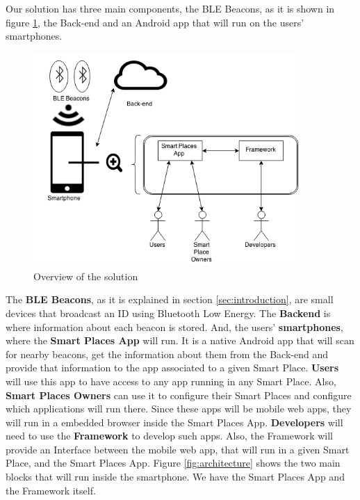 Our solution has three main components,
the BLE Beacons, as it is shown in figure 
\ref{fig:overview_architecture}, 
the Back-end and an Android app
that will run on the users' smartphones.
\begin{figure}[!ht]
  \centering
    \includegraphics[width=0.9\textwidth]{img/overview_architecture}
    \caption{Overview of the solution}
    \label{fig:overview_architecture}
\end{figure}
The \textbf{BLE Beacons}, as it is explained in section 
\ref{sec:introduction}, are small devices that broadcast
an ID using Bluetooth Low Energy. The \textbf{Backend} is where information about each beacon is stored. 
And, the users'
\textbf{smartphones}, where the \textbf{Smart Places App} will run.
It is a native Android app that will scan for nearby beacons,
get the information about them from the Back-end and
provide that information to the app associated to a 
given Smart Place.
\textbf{Users} will use this app to have access
to any app running in any Smart Place.
Also, \textbf{Smart Places Owners} can use it to configure
their Smart Places and configure which applications
will run there.
Since these apps will be mobile web apps, they will run
in a embedded browser inside the Smart Places App.
\textbf{Developers} will need to use the \textbf{Framework} to
develop such apps. Also, the Framework will provide an
Interface between the mobile web app, that will run
in a given Smart Place, and the Smart Places App.
Figure \ref{fig:architecture} shows the two main
blocks that will run inside the smartphone.
We have the Smart Places App and the Framework itself.
